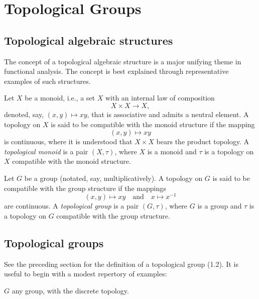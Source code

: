 \chapter{Topological Groups}

\section{Topological algebraic structures}
The concept of a topological algebraic structure is a major unifying theme in functional analysis. The concept is best explained through representative examples of such structures.


\begin{definition}
    Let \( X \) be a monoid, i.e., a set \( X \) with an internal law of composition
    \[
        X \times X \to X,
    \]
    denoted, say, \( (x, y) \mapsto xy \), that is associative and admits a neutral element.
    A topology on \( X \) is said to be compatible with the monoid structure if the mapping
    \[
        (x, y) \mapsto xy
    \]
    is continuous, where it is understood that \( X \times X \) bears the product topology.
    A \emph{topological monoid} is a pair \( (X, \tau) \), where \( X \) is a monoid and \( \tau \) is a topology on \( X \) compatible with the monoid structure.
\end{definition}


\begin{definition}
    Let \( G \) be a group (notated, say, multiplicatively).
    A topology on \( G \) is said to be compatible with the group structure if the mappings
    \[
        (x, y) \mapsto xy \quad \text{and} \quad x \mapsto x^{-1}
    \]
    are continuous.
    A \emph{topological group} is a pair \( (G, \tau) \), where \( G \) is a group and \( \tau \) is a topology on \( G \) compatible with the group structure.
\end{definition}










\section{Topological groups}
See the preceding section for the definition of a topological group (1.2).
It is useful to begin with a modest repertory of examples:

\begin{example}
    \label{ex:group-discrete-topology}

    \( G \) any group, with the discrete topology.
\end{example}

